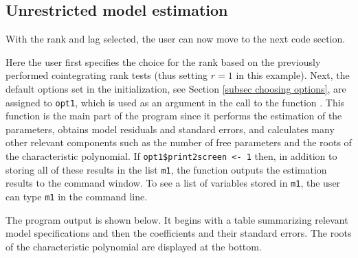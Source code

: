\documentclass[article]{jss}
\newcommand{\fct}[1]{\code{#1()}}
\begin{document}

\subsection{Unrestricted model estimation}

With the rank and lag selected, the user can now move to the next code section. 

Here the user first specifies the choice for the rank based on the previously performed cointegrating rank tests (thus setting $r=1$ in this example). Next, the default options set in the initialization, see Section \ref{subsec choosing options}, are assigned to \verb|opt1|, which is used as an argument in the call to the function \fct{FCVARestn}. This function is the main part of the program since it performs the estimation of the parameters, obtains model residuals and standard errors, and calculates many other relevant components such as the number of free parameters and the roots of the characteristic polynomial. If \verb|opt1$print2screen <- 1| then, in addition to storing all of these results in the list \verb|m1|, the function outputs the estimation results to the command window. To see a list of variables stored in \verb|m1|, the user can type \verb|m1| in the command line. 

The program output is shown below. It begins with a table summarizing relevant model specifications and then the coefficients and their standard errors. The roots of the characteristic polynomial are displayed at the bottom. 
\end{document}
